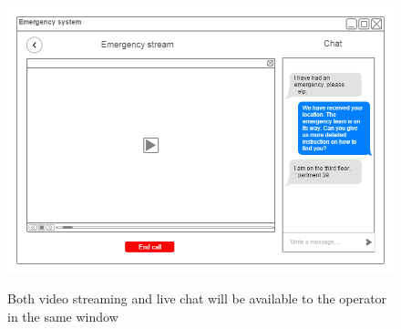 \documentclass{article}
\begin{document}
	\begin{figure}[H]
		\centering
		\includegraphics[width=1\textwidth]{"ChatIteration1/backend_video_call (1)"}
		
		Both video streaming and live chat will be available to the operator in the same window
	\end{figure}
\end{document}
